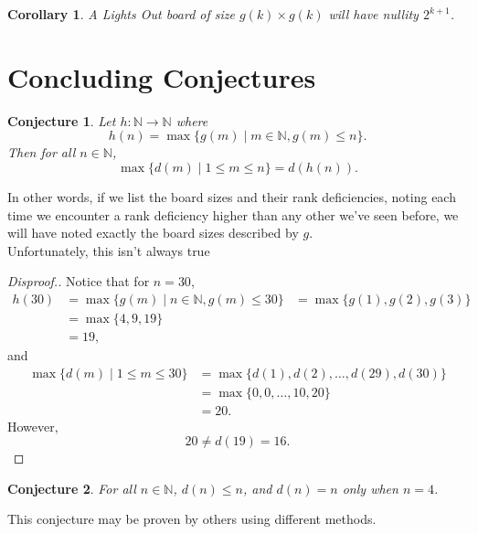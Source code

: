 \documentclass{article}
\newtheorem{corollary}{Corollary}
\newtheorem{conjecture}{Conjecture}
\newcommand{\N}{\mathbb{N}}
\begin{document}
	\begin{corollary}
		A \textit{Lights Out} board of size $g(k) \times g(k)$ will have nullity $2^{k+1}$.
	\end{corollary}
	
	\section{Concluding Conjectures}
	\begin{conjecture}
		\label{conj3}
		Let $h: \N \to \N$ where
		\begin{equation*}
			h(n) = \max \{g(m) \mid m \in \N, g(m) \leq n\}.
		\end{equation*}
		Then for all $n \in \N$,
		\begin{equation*}
			\max \{d(m) \mid 1 \leq m \leq n\} = d(h(n)).
		\end{equation*}
	\end{conjecture}
	In other words, if we list the board sizes and their rank deficiencies, noting each time we encounter a rank deficiency higher than any other we've seen before, we will have noted exactly the board sizes described by $g$. \\
	
	Unfortunately, this isn't always true
	\begin{proof}[Disproof.]
		Notice that for $n=30$,
		\begin{align*}
			h(30) &= \max\{g(m) \mid n \in \N, g(m) \leq 30\}
			&= \max\{g(1), g(2), g(3)\} \\
			&= \max\{4, 9, 19\} \\
			&= 19,
		\end{align*}
		and
		\begin{align*}
			\max\{d(m) \mid 1 \leq m \leq 30\} &= \max\{d(1),d(2),\dots,d(29),d(30)\} \\
			&= \max\{0,0,\dots,10,20\} \\
			&= 20.
		\end{align*}
		However,
		\begin{equation*}
			20 \neq d(19) = 16.
		\end{equation*}
	\end{proof}

	\begin{conjecture}
		For all $n \in \N$, $d(n) \leq n$, and $d(n) = n$ only when $n=4$.
	\end{conjecture}
	This conjecture may be proven by others using different methods.
\end{document}
